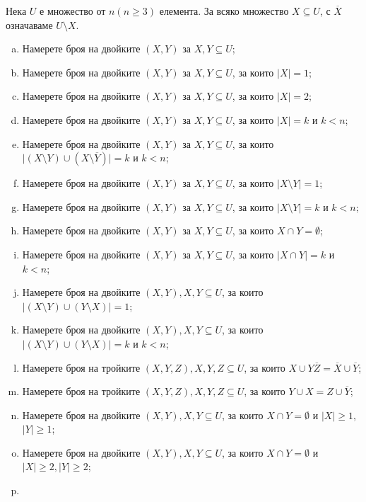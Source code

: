 \begin{problem} %
  Нека $U$ е множество от $n (n\geq 3)$ елемента. За всяко множество $X\subseteq U$, с $\overline{X}$ означаваме $U\setminus X$.
  \begin{enumerate}[a)]
  \item
    Намерете броя на двойките $(X,Y)$ за $X,Y\subseteq U$;
  \item
    Намерете броя на двойките $(X,Y)$ за $X,Y\subseteq U$, за които $\vert{X}\vert = 1$;
  \item
    Намерете броя на двойките $(X,Y)$ за $X,Y\subseteq U$, за които $\vert{X}\vert = 2$;
  \item
    Намерете броя на двойките $(X,Y)$ за $X,Y\subseteq U$, за които $\vert{X}\vert = k$ и $k < n$;
  \item
    Намерете броя на двойките $(X,Y)$ за $X,Y\subseteq U$, за които $\vert{(X\setminus{Y})\cup (X\setminus\overline{Y})}\vert = k$ и $k < n$;
  \item
    Намерете броя на двойките $(X,Y)$ за $X,Y\subseteq U$, за които $\vert{X\setminus Y}\vert = 1$;
  \item
    Намерете броя на двойките $(X,Y)$ за $X,Y\subseteq U$, за които $\vert{X\setminus Y}\vert = k$ и $k < n$;
  \item
    Намерете броя на двойките $(X,Y)$ за $X,Y\subseteq U$, за които $X\cap Y = \emptyset$;
  \item
    Намерете броя на двойките $(X,Y)$ за $X,Y\subseteq U$, за които $\vert{X\cap Y}\vert = k$ и $k < n$;
  \item
    Намерете броя на двойките $(X,Y), X,Y\subseteq U$, за които $|(X\setminus Y)\cup(Y\setminus X)| = 1$;
  \item
    Намерете броя на двойките $(X,Y), X,Y\subseteq U$, за които $|(X\setminus Y)\cup(Y\setminus X)| = k$ и $k < n$;
  \item
    Намерете броя на тройките $(X,Y,Z), X,Y,Z\subseteq U$, за които $X\cup Y\overline{Z} = \overline{X}\cup\overline{Y}$;
  \item
    Намерете броя на тройките $(X,Y,Z), X,Y,Z\subseteq U$, за които $Y\cup X = Z\cup\overline{Y}$;
  \item
    Намерете броя на двойките $(X,Y), X,Y\subseteq U$, за които $X\cap Y = \emptyset$ и
    $|X|\geq 1$, $|Y|\geq 1$;
  \item
    Намерете броя на двойките $(X,Y), X,Y\subseteq U$, за които $X\cap Y = \emptyset$ и 
    $|X|\geq 2, |Y|\geq 2$;
  \item

\end{enumerate}
\end{problem}
